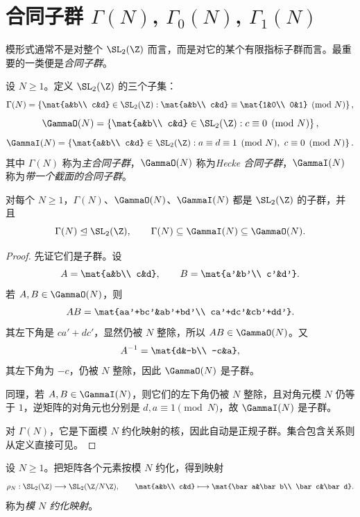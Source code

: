 \section{合同子群 $\Gamma(N)$, $\Gamma_0(N)$, $\Gamma_1(N)$}

模形式通常不是对整个 $\SL_2(\Z)$ 而言，而是对它的某个有限指标子群而言。最重要的一类便是\emph{合同子群}。

\begin{definition}
设 $N\ge 1$。定义 $\SL_2(\Z)$ 的三个子集：
\[
\Gamma(N)=\left\{\mat{a&b\\ c&d}\in \SL_2(\Z):
\mat{a&b\\ c&d}\equiv \mat{1&0\\ 0&1}\pmod N\right\},
\]
\[
\GammaO(N)=\left\{\mat{a&b\\ c&d}\in \SL_2(\Z):c\equiv 0\pmod N\right\},
\]
\[
\GammaI(N)=\left\{\mat{a&b\\ c&d}\in \SL_2(\Z):a\equiv d\equiv 1\pmod N,\ c\equiv 0\pmod N\right\}.
\]
其中 $\Gamma(N)$ 称为\emph{主合同子群}，$\GammaO(N)$ 称为\emph{Hecke 合同子群}，$\GammaI(N)$ 称为\emph{带一个截面的合同子群}。
\end{definition}

\begin{proposition}
对每个 $N\ge 1$，$\Gamma(N)$、$\GammaO(N)$、$\GammaI(N)$ 都是 $\SL_2(\Z)$ 的子群，并且
\[
\Gamma(N)\trianglelefteq \SL_2(\Z),
\qquad
\Gamma(N)\subseteq \GammaI(N)\subseteq \GammaO(N).
\]
\end{proposition}

\begin{proof}
先证它们是子群。设
\[
A=\mat{a&b\\ c&d},\qquad B=\mat{a'&b'\\ c'&d'}.
\]
若 $A,B\in \GammaO(N)$，则
\[
AB=\mat{aa'+bc'&ab'+bd'\\ ca'+dc'&cb'+dd'}.
\]
其左下角是 $ca'+dc'$，显然仍被 $N$ 整除，所以 $AB\in \GammaO(N)$。又
\[
A^{-1}=\mat{d&-b\\ -c&a},
\]
其左下角为 $-c$，仍被 $N$ 整除，因此 $\GammaO(N)$ 是子群。

同理，若 $A,B\in \GammaI(N)$，则它们的左下角仍被 $N$ 整除，且对角元模 $N$ 仍等于 $1$，逆矩阵的对角元也分别是 $d,a\equiv 1\pmod N$，故 $\GammaI(N)$ 是子群。

对 $\Gamma(N)$，它是下面模 $N$ 约化映射的核，因此自动是正规子群。集合包含关系则从定义直接可见。
\end{proof}

\begin{definition}
设 $N\ge 1$。把矩阵各个元素按模 $N$ 约化，得到映射
\[
\rho_N:\SL_2(\Z)\longrightarrow \SL_2(\Z/N\Z),
\qquad
\mat{a&b\\ c&d}\longmapsto \mat{\bar a&\bar b\\ \bar c&\bar d}.
\]
称为\emph{模 $N$ 约化映射}。
\end{definition}

